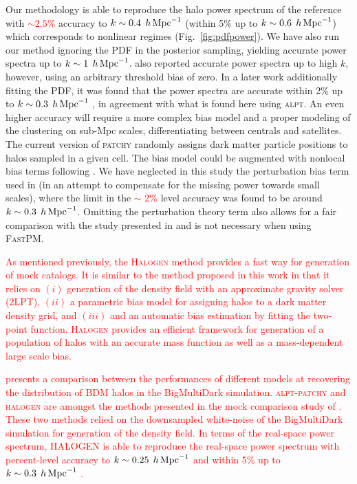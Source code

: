 \documentclass[english,usenatbib]{mn2e}
\newcommand{\tod}[1]{{\textcolor{red}{ #1}}}
\newcommand{\hperm}{\,h\,{\rm Mpc}^{-1}}
\begin{document}
Our methodology is able to reproduce the halo power spectrum of the reference with \tod{$\sim 2.5\%$} accuracy to $k \sim 0.4 \; \hperm$ (within 5\% up to $k \sim 0.6 \; \hperm$) which corresponds to  nonlinear regimes (Fig.~\ref{fig:pdfpower}). We have also run our method ignoring the PDF in the posterior sampling, yielding accurate power spectra up to $k\sim 1 \; \hperm$. \citet[][]{kitaura2014} also reported accurate power spectra up to high $k$, however, using an arbitrary threshold bias of zero. In a later work additionally fitting the PDF, it was found that the power spectra are accurate within 2\% up to $k\sim 0.3 \; \hperm$ \citep[][]{kitaura2015}, in agreement with what is found here using \textsc{alpt}. 
An even higher accuracy will require a more  complex bias model and a proper modeling of the clustering on sub-Mpc scales, differentiating between centrals and satellites. The current version of \textsc{patchy} randomly assigns dark matter particle positions to halos sampled in a given cell.
The bias model could be augmented with nonlocal bias terms following \citet[][]{mcdonald2009}. We have neglected in this study the perturbation bias term used in \citet{kitaura2016} (in an attempt to compensate for the missing power towards small scales), where the limit in the \tod{$\sim$ 2\%} level accuracy was found to be around $k\sim 0.3 \; \hperm$. Omitting the perturbation theory term also allows for a fair comparison with the study presented in \citet[][]{kitaura2015} and is not necessary when using \textsc{FastPM}. 

\tod{As mentioned previously, the \textsc{Halogen} \citealt{halogen} method provides a fast way for generation of mock catalogs. It is similar to the method proposed in this work in that it relies on $(i)$ generation of the density field with an approximate gravity solver (2LPT), $(ii)$ a parametric bias model for assigning halos to a dark matter density grid, and $(iii)$ and an automatic bias estimation by fitting the two-point function. \textsc{Halogen} provides an efficient framework for generation of a population of halos with an accurate mass function as well as a mass-dependent large scale bias.}

\tod{\citet{chuang2015} presents a comparison between the performances of different models at recovering the distribution of BDM halos in the BigMultiDark simulation. \textsc{alpt-patchy} and \textsc{halogen} are amongst the methods presented in the mock comparison study of \citet{chuang2015}. These two methods relied on the downsampled white-noise of the BigMultiDark simulation for generation of the density field. In terms of the real-space power spectrum, \textsc{HALOGEN} is able to reproduce the real-space power spectrum with percent-level accuracy to $k \sim 0.25 \; \hperm$  and within 5\% up to $k \sim 0.3 \; \hperm$ \citep[see real-space lines in the lower panels in Fig.~11 of][]{chuang2015}.}
\end{document}
